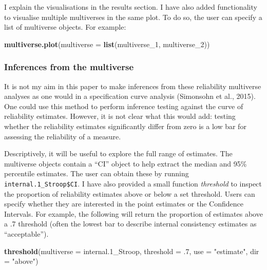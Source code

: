 \documentclass[english,man,floatsintext]{apa6}
\newenvironment{Shaded}{\begin{snugshade}}{\end{snugshade}}
\newcommand{\DataTypeTok}[1]{\textcolor[rgb]{0.13,0.29,0.53}{#1}}
\newcommand{\DecValTok}[1]{\textcolor[rgb]{0.00,0.00,0.81}{#1}}
\newcommand{\FloatTok}[1]{\textcolor[rgb]{0.00,0.00,0.81}{#1}}
\newcommand{\KeywordTok}[1]{\textcolor[rgb]{0.13,0.29,0.53}{\textbf{#1}}}
\newcommand{\NormalTok}[1]{#1}
\newcommand{\StringTok}[1]{\textcolor[rgb]{0.31,0.60,0.02}{#1}}
\begin{document}
I explain the visualisations in the results section. I have also added functionality to visualise multiple multiverses in the same plot. To do so, the user can specify a list of multiverse objects. For example:

\begin{Shaded}
\begin{Highlighting}[]
\KeywordTok{multiverse.plot}\NormalTok{(}\DataTypeTok{multiverse =} \KeywordTok{list}\NormalTok{(multiverse_}\DecValTok{1}\NormalTok{,}
\NormalTok{                                  multiverse_}\DecValTok{2}\NormalTok{))}
\end{Highlighting}
\end{Shaded}

\hypertarget{inferences-from-the-multiverse}{%
\subsubsection{Inferences from the multiverse}\label{inferences-from-the-multiverse}}

It is not my aim in this paper to make inferences from these reliability multiverse analyses as one would in a specification curve analysis (Simonsohn et al., 2015). One could use this method to perform inference testing against the curve of reliability estimates. However, it is not clear what this would add: testing whether the reliability estimates significantly differ from zero is a low bar for assessing the reliability of a measure.

Descriptively, it will be useful to explore the full range of estimates. The multiverse objects contain a \enquote{CI} object to help extract the median and 95\% percentile estimates. The user can obtain these by running \texttt{internal.1\_Stroop\$CI}. I have also provided a small function \emph{threshold} to inspect the proportion of reliability estimates above or below a set threshold. Users can specify whether they are interested in the point estimates or the Confidence Intervals. For example, the following will return the proportion of estimates above a .7 threshold (often the lowest bar to describe internal consistency estimates as \enquote{acceptable}).

\begin{Shaded}
\begin{Highlighting}[]
\KeywordTok{threshold}\NormalTok{(}\DataTypeTok{multiverse =}\NormalTok{ internal}\FloatTok{.1}\NormalTok{_Stroop,}
          \DataTypeTok{threshold =} \FloatTok{.7}\NormalTok{,}
          \DataTypeTok{use =} \StringTok{"estimate"}\NormalTok{,}
          \DataTypeTok{dir =} \StringTok{"above"}\NormalTok{)}
\end{Highlighting}
\end{Shaded}
\end{document}

